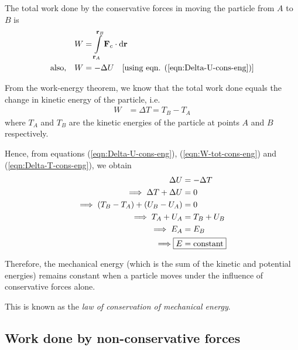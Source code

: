 		The total work done by the conservative forces in moving the particle from $A$ to $B$ is
		\begin{align}
			W&=\int\limits_{\vb{r}_A}^{\vb{r}_B}{\vb{F}_c\cdot\dd{\vb{r}}} \label{eqn:W-tot-cons-eng}\\
			\qq{also,}W&=-\Delta U\qq{[using eqn. (\ref{eqn:Delta-U-cons-eng})]} \nonumber
		\end{align}
		
		From the work-energy theorem, we know that the total work done equals the change in kinetic energy of the particle, i.e.
		\begin{align}
			W&=\Delta T=T_B - T_A \label{eqn:Delta-T-cons-eng}
		\end{align}
		where $T_A$ and $T_B$ are the kinetic energies of the particle at points $A$ and $B$ respectively.
		
		Hence, from equations (\ref{eqn:Delta-U-cons-eng}), (\ref{eqn:W-tot-cons-eng}) and (\ref{eqn:Delta-T-cons-eng}), we obtain
		\begin{align*}
			\Delta U&=-\Delta T \\
			\implies\Delta T+\Delta U&=0 \\
			\implies\qty(T_B-T_A)+\qty(U_B-U_A)&=0 \\
			\implies T_A+U_A&=T_B+U_B \\
			\implies E_A&=E_B \\
			\implies\Aboxed{E&=\text{constant}}
		\end{align*}
		
		Therefore, the mechanical energy (which is the sum of the kinetic and potential energies) remains constant when a particle moves under the influence of conservative forces alone.
		
		This is known as the \emph{law of conservation of mechanical energy}.
	
	\subsection{Work done by non-conservative forces}